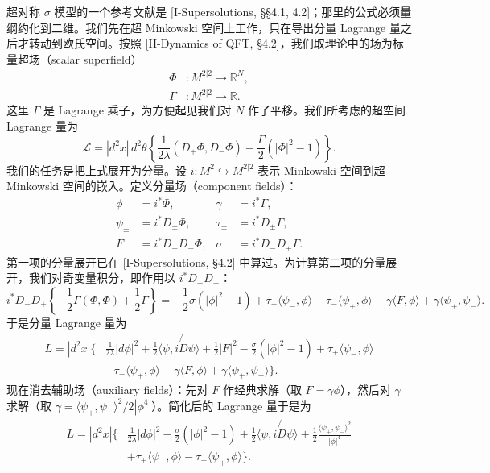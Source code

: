 超对称 $\sigma$ 模型的一个参考文献是 [I-Supersolutions, §§4.1, 4.2]；那里的公式必须量纲约化到二维。我们先在超 Minkowski 空间上工作，只在导出分量 Lagrange 量之后才转动到欧氏空间。按照 [II-Dynamics of QFT, §4.2]，我们取理论中的场为标量超场（scalar superfield）
\begin{align*}
\Phi&\colon M^{2|2}\longrightarrow\mathbb{R}^N,\\
\Gamma&\colon M^{2|2}\longrightarrow\mathbb{R}.
\end{align*}
这里 $\Gamma$ 是 Lagrange 乘子，为方便起见我们对 $N$ 作了平移。我们所考虑的超空间 Lagrange 量为
\[
\mathcal{L}=|d^2x|\,d^2\theta\left\{\frac{1}{2\lambda}(D_+\Phi,D_-\Phi)-\frac{\Gamma}{2}(|\Phi|^2-1)\right\}.
\]
我们的任务是把上式展开为分量。设 $i\colon M^2\hookrightarrow M^{2|2}$ 表示 Minkowski 空间到超 Minkowski 空间的嵌入。定义分量场（component fields）：
\begin{align*}
\phi&=i^*\Phi, & \gamma&=i^*\Gamma,\\
\psi_\pm&=i^*D_\pm\Phi, & \tau_\pm&=i^*D_\pm\Gamma,\\
F&=i^*D_-D_+\Phi, & \sigma&=i^*D_-D_+\Gamma.
\end{align*}
第一项的分量展开已在 [I-Supersolutions, §4.2] 中算过。为计算第二项的分量展开，我们对奇变量积分，即作用以 $i^*D_-D_+$：
\[
i^*D_-D_+\left\{-\frac12\Gamma(\Phi,\Phi)+\frac12\Gamma\right\}
=-\frac12\sigma(|\phi|^2-1)+\tau_+\langle\psi_-,\phi\rangle
-\tau_-\langle\psi_+,\phi\rangle-\gamma\langle F,\phi\rangle+\gamma\langle\psi_+,\psi_-\rangle .
\]
于是分量 Lagrange 量为
\begin{align*}
L=|d^2x|\Big\{&\frac{1}{2\lambda}|d\phi|^2+\frac12\langle\psi,i\not{D}\psi\rangle+\frac12|F|^2-\frac{\sigma}{2}(|\phi|^2-1)+\tau_+\langle\psi_-,\phi\rangle\\
&-\tau_-\langle\psi_+,\phi\rangle-\gamma\langle F,\phi\rangle+\gamma\langle\psi_+,\psi_-\rangle\Big\}.
\end{align*}
现在消去辅助场（auxiliary fields）：先对 $F$ 作经典求解（取 $F=\gamma\phi$），然后对 $\gamma$ 求解（取 $\gamma=\langle\psi_+,\psi_-\rangle^2/2|\phi^4|$）。简化后的 Lagrange 量于是为
\begin{align*}
L=|d^2x|\Big\{&\frac{1}{2\lambda}|d\phi|^2-\frac{\sigma}{2}(|\phi|^2-1)+\frac12\langle\psi,i\not{D}\psi\rangle+\frac12\frac{\langle\psi_+,\psi_-\rangle^2}{|\phi|^4}\\
&+\tau_+\langle\psi_-,\phi\rangle-\tau_-\langle\psi_+,\phi\rangle\Big\}.
\end{align*}


